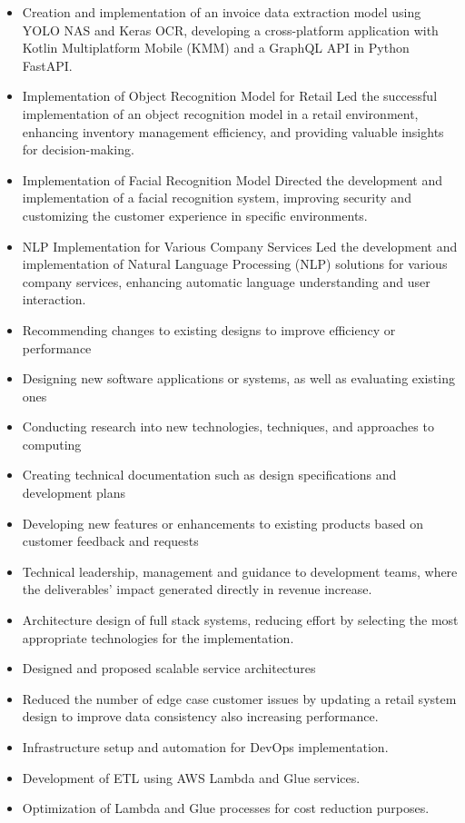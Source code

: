 \begin{itemize}

  \item Creation and implementation of an invoice data extraction model using YOLO NAS and Keras OCR, developing a cross-platform application with Kotlin Multiplatform Mobile (KMM) and a GraphQL API in Python FastAPI.

  \item Implementation of Object Recognition Model for Retail
 Led the successful implementation of an object recognition model in a retail environment, enhancing inventory management efficiency, and providing valuable insights for decision-making.

  \item Implementation of Facial Recognition Model
 Directed the development and implementation of a facial recognition system, improving security and customizing the customer experience in specific environments.
  \item NLP Implementation for Various Company Services
 Led the development and implementation of Natural Language Processing (NLP) solutions for various company services, enhancing automatic language understanding and user interaction.
  \item Recommending changes to existing designs to improve efficiency or performance
  \item Designing new software applications or systems, as well as evaluating existing ones
  \item Conducting research into new technologies, techniques, and approaches to computing
  \item Creating technical documentation such as design specifications and development plans
  \item Developing new features or enhancements to existing products based on customer feedback and requests
  \item Technical leadership, management and guidance to development teams, where the deliverables’ impact generated directly in revenue increase.
  \item Architecture design of full stack systems, reducing effort by selecting the most appropriate technologies for the implementation.
  \item Designed and proposed scalable service architectures
  \item Reduced the number of edge case customer issues by updating a retail system design to improve data consistency also increasing performance.
  \item Infrastructure setup and automation for DevOps implementation.
  \item Development of ETL using AWS Lambda and Glue services.
  \item Optimization of Lambda and Glue processes for cost reduction purposes.
\end{itemize}

